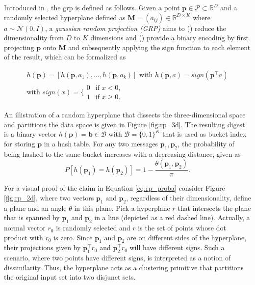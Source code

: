 \documentclass[../../../main.tex]{subfiles}
\begin{document}
Introduced in \cite{charikar2002similarity}, the \gls{grp} is defined as follows. Given a point $\bm{p} \in \mathcal{P} \subset \mathbb{R}^D$ and a randomly selected hyperplane defined as $\bm{M}=(a_{ij}) \in \mathbb{R}^{D \times K}$ where $a \sim \mathcal{N}(0, I)$, a \textit{gaussian random projection (GRP)} aims to () reduce the dimensionality from $D$ to $K$ dimensions and () provide a binary encoding by first projecting $\bm{p}$ onto $\bm{M}$ and subsequently applying the sign function to each element of the result, which can be formalized as

\begin{gather}\label{eq:grp_sign}
    h(\bm{p}) = [h(\bm{p}, a_1), \dots, h(\bm{p}, a_k)] \text{ with } h(\bm{p}, a) = sign(\bm{p}^\top a) \\
    \text{with } sign(x) = \Biggl\{ \begin{array}{lc}
        0 & \text{if } x < 0, \\
        1 & \text{if } x \geq 0.
    \end{array}
\end{gather}

An illistration of a random hyperplane that dissects the three-dimensional space and partitions the data space is given in Figure \ref{fig:rp_3d}. The resulting digest is a binary vector $h(\bm{p}) = \bm{b} \in \mathcal{B}$ with $\mathcal{B} = \{0, 1\}^K$ that is used as bucket index for storing $\bm{p}$ in a hash table. For any two messages $\bm{p}_1, \bm{p}_2$, the probability of being hashed to the same bucket increases with a decreasing distance, given as
\begin{equation}\label{eq:rp_proba}
    P[h(\bm{p}_1) = h(\bm{p}_2)] = 1 - \frac{\theta(\bm{p}_1, \bm{p}_2)}{\pi}.
\end{equation}

For a visual proof of the claim in Equation \ref{eq:rp_proba} consider Figure \ref{fig:rp_2d}, where two vectors $\bm{p}_1$ and $\bm{p}_2$, regardless of their dimensionality, define a plane and an angle $\theta$ in this plane. Pick a hyperplane $r$ that intersects the plane that is spanned by $\bm{p}_1$ and $\bm{p}_2$ in a line (depicted as a red dashed line). Actually, a normal vector $r_0$ is randomly selected and $r$ is the set of points whose dot product with $r_0$ is zero. Since $\bm{p}_1$ and $\bm{p}_2$ are on different sides of the hyperplane, their projections given by $\bm{p}_1^\top r_0$ and  $\bm{p}_2^\top r_0$ will have different signs. Such a scenario, where two points have different signs, is interpreted as a notion of dissimilarity. Thus, the hyperplane acts as a clustering primitive that partitions the original input set into two disjunct sets.
\end{document}
